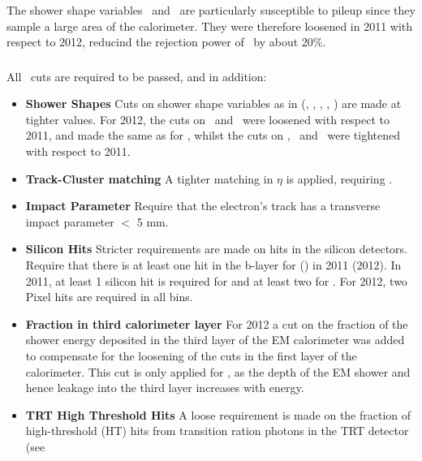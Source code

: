 The shower shape variables \Reta\ and \Rhad\ are particularly susceptible to
pileup since they sample a large area of the calorimeter. They were therefore
loosened in 2011 with respect to 2012, reducind the rejection power of \loosePP\
by about 20\%.

\subsubsection{\mediumPP}

All \looseePP\ cuts are required to be passed, and in addition:

\begin{itemize}
    \item {\bf Shower Shapes} Cuts on shower shape variables as in \loosePP
    (\Reta, \Rhad, \wetatwo, \Eratio, \wstot) are made at tighter values. For
    2012, the cuts on \Reta\ and \Rhad\ were loosened with respect to 2011, and
    made the  same as for \loosePP, whilst the cuts on  \wetatwo, \Eratio\ and
    \wstot\ were tightened with respect to 2011.

    \item {\bf Track-Cluster matching} A tighter matching in $\eta$ is applied,
    requiring \deltaetalt{0.005}.

    \item {\bf Impact Parameter} Require that the electron's track has a
    transverse impact parameter \dzero $<$ 5 mm.

    \item {\bf Silicon Hits} Stricter requirements are made on hits in the
    silicon detectors. Require that there is at least one hit in the b-layer for
     (\modetalt{2.37}) in 2011 (2012). In 2011, at least 1
    silicon hit is required for \modetalt{2.01} and at least two for
    \modetagt{2.01}. For 2012, two Pixel hits are required in all bins.

    \item {\bf Fraction in third calorimeter layer \fthree} For 2012 a cut on the
    fraction of the shower energy deposited in the third layer of the EM
    calorimeter was added to compensate for the loosening of the cuts in the
    first layer of the calorimeter. This cut is only applied for \etlt{80}, as
    the depth of the EM shower and hence leakage into the third layer increases
    with energy.

    \item {\bf TRT High Threshold Hits} A loose requirement is made on the
    fraction of high-threshold (HT) hits from transition ration photons in the
    TRT detector (see~\sec{Detector-TRT}

\end{itemize}


